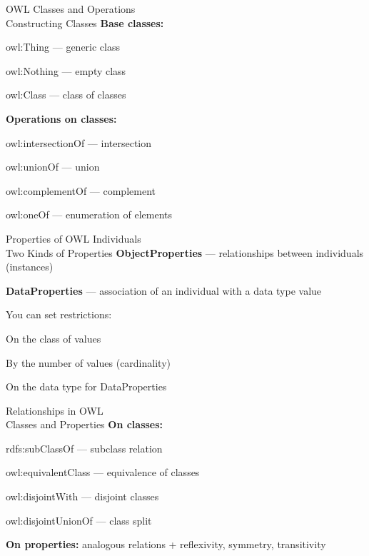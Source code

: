 \begin{frame}{OWL Classes and Operations\\Constructing Classes}
	\topline
	\justifying
	\textbf{Base classes:}
	\begin{textitemize}
		\item owl:Thing --- generic class
		\item owl:Nothing --- empty class
		\item owl:Class --- class of classes
	\end{textitemize}
	
	\textbf{Operations on classes:}
	\begin{textitemize}
		\item owl:intersectionOf --- intersection
		\item owl:unionOf --- union
		\item owl:complementOf --- complement
		\item owl:oneOf --- enumeration of elements
	\end{textitemize}
\end{frame}

\begin{frame}{Properties of OWL Individuals\\Two Kinds of Properties}
	\topline
	\justifying
	\textbf{ObjectProperties} --- relationships between individuals (instances)
	
	\textbf{DataProperties} --- association of an individual with a data type value
	
	\vspace{0.5cm}
	You can set restrictions:
	\begin{textitemize}
		\item On the class of values
		\item By the number of values (cardinality)
		\item On the data type for DataProperties
	\end{textitemize}
\end{frame}

\begin{frame}{Relationships in OWL\\Classes and Properties}
	\topline
	\justifying
	\textbf{On classes:}
	\begin{textitemize}
		\item rdfs:subClassOf --- subclass relation
		\item owl:equivalentClass --- equivalence of classes
		\item owl:disjointWith --- disjoint classes
		\item owl:disjointUnionOf --- class split
	\end{textitemize}
	
	\textbf{On properties:} analogous relations + reflexivity, symmetry, transitivity
\end{frame}

